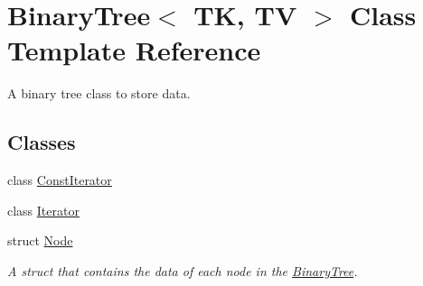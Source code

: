 \hypertarget{classBinaryTree}{}\section{Binary\+Tree$<$ TK, TV $>$ Class Template Reference}
\label{classBinaryTree}


A binary tree class to store data.  


\subsection*{Classes}
\begin{DoxyCompactItemize}
\item 
class \mbox{\hyperlink{classBinaryTree_1_1ConstIterator}{Const\+Iterator}}
\item 
class \mbox{\hyperlink{classBinaryTree_1_1Iterator}{Iterator}}
\item 
struct \mbox{\hyperlink{structBinaryTree_1_1Node}{Node}}
\begin{DoxyCompactList}\small\item\em A struct that contains the data of each node in the \mbox{\hyperlink{classBinaryTree}{Binary\+Tree}}. \end{DoxyCompactList}\end{DoxyCompactItemize}
